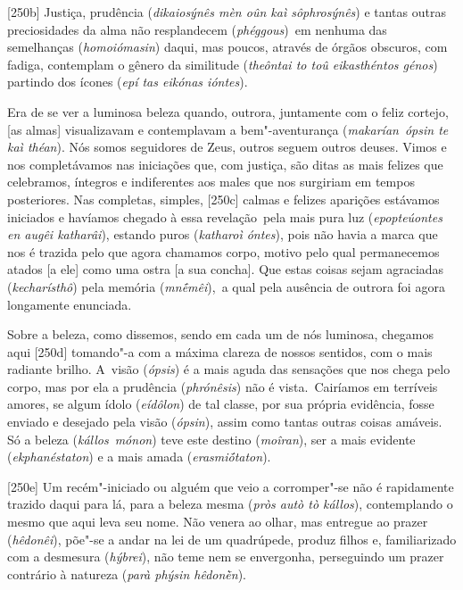 [250b] Justiça, prudência (\emph{dikaiosýnês mèn oûn kaì
sôphrosýnês}) e tantas outras preciosidades da alma não resplandecem
(\emph{phéggous})~em nenhuma das semelhanças (\emph{homoiómasin}) daqui,
mas poucos, através de órgãos obscuros, com fadiga, contemplam o gênero
da similitude (\emph{theôntai to toû eikasthéntos génos}) partindo dos
ícones (\emph{epí tas eikónas ióntes}).

Era de se ver a luminosa beleza quando, outrora, juntamente com o feliz
cortejo, [as almas] visualizavam e contemplavam a bem"-aventurança
(\emph{makarían}~\emph{ópsin te kaì théan}). Nós somos seguidores de
Zeus, outros seguem outros deuses. Vimos e nos completávamos nas
iniciações que, com justiça, são ditas as mais felizes que celebramos,
íntegros e indiferentes aos males que nos surgiriam em tempos
posteriores. Nas completas, simples, [250c] calmas e felizes
aparições estávamos iniciados e havíamos chegado à essa revelação~pela
mais pura luz (\emph{epopteúontes en augêi katharâi}), estando puros
(\emph{katharoì óntes}), pois não havia a marca que nos é trazida pelo
que agora chamamos corpo, motivo pelo qual permanecemos atados [a
ele] como uma ostra [a sua concha]. Que estas coisas sejam
agraciadas (\emph{kecharísthô}) pela memória (\emph{mnḗmêi}),~a qual
pela ausência de outrora foi agora longamente enunciada.

Sobre a beleza, como dissemos, sendo em cada um de nós luminosa,
chegamos aqui [250d] tomando"-a com a máxima clareza de nossos
sentidos, com o mais radiante brilho. A~visão (\emph{ópsis}) é a mais
aguda das sensações que nos chega pelo corpo, mas por ela a prudência
(\emph{phrónêsis}) não é vista.~Cairíamos em terríveis amores, se algum
ídolo (\emph{eídôlon}) de tal classe, por sua própria evidência, fosse
enviado e desejado pela visão (\emph{ópsin}), assim como tantas outras
coisas amáveis. Só a beleza (\emph{kállos}~\emph{mónon}) teve este
destino (\emph{moîran}), ser a mais evidente (\emph{ekphanéstaton}) e a
mais amada (\emph{erasmiṓtaton}).

[250e] Um recém"-iniciado ou alguém que veio a corromper"-se não é
rapidamente trazido daqui para lá, para a beleza mesma (\emph{pròs autò
tò kállos}), contemplando o mesmo que aqui leva seu nome. Não venera ao
olhar, mas entregue ao prazer (\emph{hêdonêi}), põe"-se a andar na lei de
um quadrúpede, produz filhos e, familiarizado com a desmesura
(\emph{hýbrei}), não teme nem se envergonha, perseguindo um prazer
contrário à natureza (\emph{parà phýsin hêdonḕn}).

